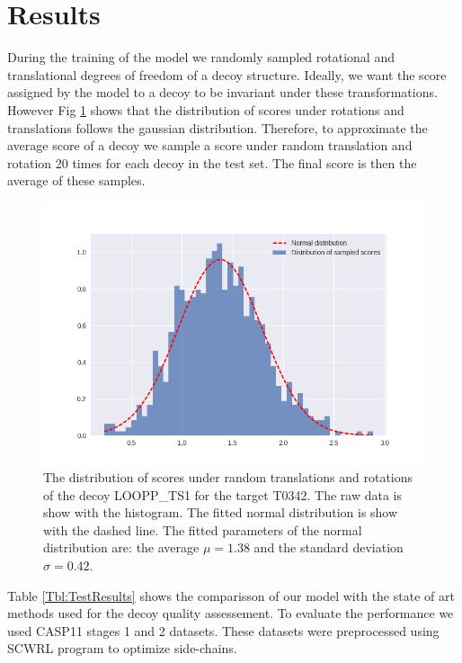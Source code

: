 \documentclass[a4paper,10pt]{article}
\begin{document}
\section{Results}
During the training of the model we randomly sampled rotational and translational degrees of freedom of a decoy structure. Ideally, we 
want the score assigned by the model to a decoy to be invariant under these transformations. However Fig \ref{} shows that the distribution
of scores under rotations and translations follows the gaussian distribution. Therefore, to approximate the average score of a decoy we 
sample a score under random translation and rotation 20 times for each decoy in the test set. The final score is then the average of these 
samples.

\begin{figure}[H]
    \centering
    \includegraphics[width=\linewidth]{Fig/sampling_dist.png}
    \caption{The distribution of scores under random translations and rotations of the decoy LOOPP\_TS1 for the target T0342. The raw data
    is show with the histogram. The fitted normal distribution is show with the dashed line. The fitted parameters of the normal distribution are:
    the average $\mu = 1.38$ and the standard deviation $\sigma = 0.42$.}
    \label{Fig:TrainingLoss}
\end{figure}


Table \ref{Tbl:TestResults} shows the comparisson of our model with the state of art methods used for the decoy quality assessement. 
To evaluate the performance we used CASP11 stages 1 and 2 datasets. 
These datasets were preprocessed using SCWRL program to optimize side-chains. 
\end{document}
